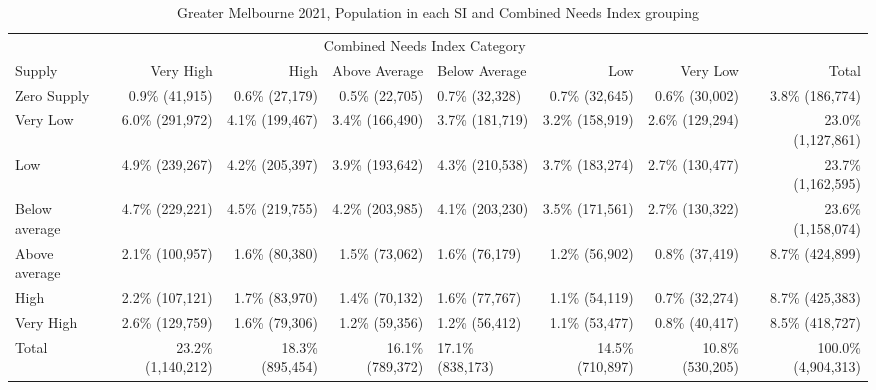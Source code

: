 \documentclass[preprint, 3p,
authoryear]{elsarticle} %
\begin{document}
\begin{table}

\caption{\label{tab:Greater_Melbourne_2021_needs_gap_population}Greater Melbourne 2021, Population in each SI and Combined Needs Index grouping}
\centering
\fontsize{6}{8}\selectfont
\begin{tabular}[t]{l|r|r|r|l|r|r|r}
\hline
\multicolumn{1}{c|}{ } & \multicolumn{6}{c|}{Combined Needs Index Category} & \multicolumn{1}{c}{ } \\
\cline{2-7}
Supply & Very High & High & Above Average & Below Average & Low & Very Low & Total\\
\hline
Zero Supply & 0.9\%    (41,915) & 0.6\%  (27,179) & 0.5\%  (22,705) & 0.7\%  (32,328) & 0.7\%  (32,645) & 0.6\%  (30,002) & 3.8\%   (186,774)\\
\hline
Very Low & 6.0\%   (291,972) & 4.1\% (199,467) & 3.4\% (166,490) & 3.7\% (181,719) & 3.2\% (158,919) & 2.6\% (129,294) & 23.0\% (1,127,861)\\
\hline
Low & 4.9\%   (239,267) & 4.2\% (205,397) & 3.9\% (193,642) & 4.3\% (210,538) & 3.7\% (183,274) & 2.7\% (130,477) & 23.7\% (1,162,595)\\
\hline
Below average & 4.7\%   (229,221) & 4.5\% (219,755) & 4.2\% (203,985) & 4.1\% (203,230) & 3.5\% (171,561) & 2.7\% (130,322) & 23.6\% (1,158,074)\\
\hline
Above average & 2.1\%   (100,957) & 1.6\%  (80,380) & 1.5\%  (73,062) & 1.6\%  (76,179) & 1.2\%  (56,902) & 0.8\%  (37,419) & 8.7\%   (424,899)\\
\hline
High & 2.2\%   (107,121) & 1.7\%  (83,970) & 1.4\%  (70,132) & 1.6\%  (77,767) & 1.1\%  (54,119) & 0.7\%  (32,274) & 8.7\%   (425,383)\\
\hline
Very High & 2.6\%   (129,759) & 1.6\%  (79,306) & 1.2\%  (59,356) & 1.2\%  (56,412) & 1.1\%  (53,477) & 0.8\%  (40,417) & 8.5\%   (418,727)\\
\hline
Total & 23.2\% (1,140,212) & 18.3\% (895,454) & 16.1\% (789,372) & 17.1\% (838,173) & 14.5\% (710,897) & 10.8\% (530,205) & 100.0\% (4,904,313)\\
\hline
\end{tabular}
\end{table}
\end{document}

